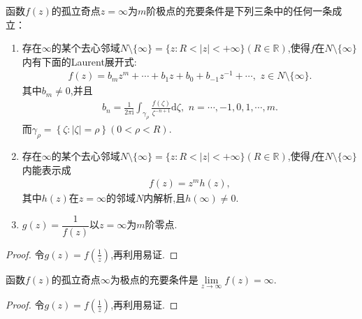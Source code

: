 \documentclass[../../main.tex]{subfiles}%
\begin{document}
\begin{theorem}\label{theorem:无穷远点为m阶极点的充要条件}
函数$f(z)$的孤立奇点$z=\infty$为$m$阶极点的充要条件是下列三条中的任何一条成立：
\begin{enumerate}[(1)]
\item\label{theorem:无穷远点为m阶极点的充要条件-1} 存在$\infty$的某个去心邻域$N\setminus \{\infty\}=\{z:R<|z|<+\infty\}(R\in \mathbb{R})$,使得\( f \)在$N\setminus \{\infty\}$内有下面的Laurent展开式:
\begin{align*}
f(z) = b_m z^m + \cdots + b_1 z + b_0 + b_{-1} z^{-1} + \cdots,\,\,z\in N\setminus \{\infty\}.
\end{align*}
其中$b_m\neq 0$,并且
\begin{align*}
b_n=\frac{1}{2\pi \mathrm{i}}\int_{\gamma _{\rho}}{\frac{f\left( \zeta \right)}{\zeta^{-n+1}}\mathrm{d}\zeta},\,\,n=\cdots,-1,0,1,\cdots,m .
\end{align*}
而$\gamma _{\rho}=\left\{ \zeta :\left| \zeta \right|=\rho \right\}(0<\rho <R) .$

\item\label{theorem:无穷远点为m阶极点的充要条件-2} 存在$\infty$的某个去心邻域$N\setminus \{\infty\}=\{z:R<|z|<+\infty\}(R\in \mathbb{R})$,使得\( f \)在$N\setminus \{\infty\}$内能表示成
\begin{align*}
f(z)=z^m h(z),
\end{align*}
其中$h(z)$在$z=\infty$的邻域$N$内解析,且$h(\infty)\neq0$.

\item\label{theorem:无穷远点为m阶极点的充要条件-3} $g(z)=\dfrac{1}{f(z)}$以$z=\infty$为$m$阶零点.
\end{enumerate}
\end{theorem}
\begin{proof}

令$g(z)=f\left( \frac{1}{z} \right) $,再利用易证.

\end{proof}

\begin{theorem}
函数$f(z)$的孤立奇点$\infty$为极点的充要条件是$\lim\limits_{z \to \infty}f(z)=\infty$.
\end{theorem}
\begin{proof}

令$g(z)=f\left( \frac{1}{z} \right) $,再利用易证.

\end{proof}
\end{document}

